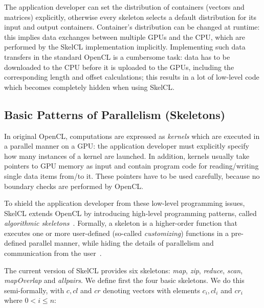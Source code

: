 The application developer can set the distribution of containers (vectors and matrices) explicitly, otherwise every skeleton selects a default distribution for its input and output containers.
Container's distribution can be changed at runtime:
this implies data exchanges between multiple GPUs and the CPU, which are performed by the SkelCL implementation implicitly.
Implementing such data transfers in the standard OpenCL is a cumbersome task:
data has to be downloaded to the CPU before it is uploaded to the GPUs, including the corresponding length and offset calculations;
this results in a lot of low-level code which becomes completely hidden when using SkelCL.


\subsection{Basic Patterns of Parallelism (Skeletons)}
\label{sec:skelcl:skeletons}
In original OpenCL, computations are expressed as \emph{kernels} which are executed in a parallel manner on a GPU: the application developer must explicitly specify how many instances of a kernel are launched.
In addition, kernels usually take pointers to GPU memory as input and contain program code for reading/writing single data items from/to it.
These pointers have to be used carefully, because no boundary checks are performed by OpenCL.

To shield the application developer from these low-level programming issues, SkelCL extends OpenCL by introducing high-level programming patterns, called \emph{algorithmic skeletons}~\cite{gc11}.
Formally, a skeleton is a higher-order function that executes one or more user-defined (so-called \emph{customizing}) functions in a pre-defined parallel manner, while hiding the details of parallelism and communication from the user~\cite{gc11}.

The current version of SkelCL provides six skeletons: \emph{map}, \emph{zip}, \emph{reduce}, \emph{scan}, \emph{mapOverlap} and \emph{allpairs}.
We define first the four basic skeletons. We do this semi-formally, with $c, cl$ and $cr$ denoting vectors with elements $c_i, cl_i$ and $cr_i$ where $0 < i \leq n$:

